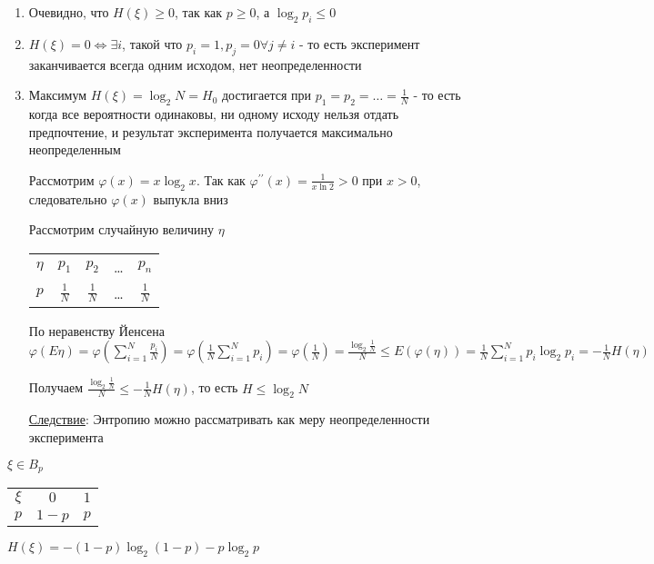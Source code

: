 \documentclass[12pt]{article}
\begin{document}
\begin{enumerate}
    \item Очевидно, что $H(\xi) \geq 0$, так как $p \geq 0$, а $\log_2 p_i \leq 0$
    
    \item $H(\xi) = 0 \Longleftrightarrow \exists i$, такой что $p_i = 1, p_j = 0 \forall j \neq i$ - то есть эксперимент заканчивается всегда одним исходом, нет неопределенности

    \item Максимум $H(\xi) = \log_2 N = H_0$ достигается при $p_1 = p_2 = \dots = \frac{1}{N}$ - то есть когда все вероятности одинаковы, ни одному исходу нельзя отдать предпочтение, и результат эксперимента получается максимально неопределенным

    \begin{MyProof}
        Рассмотрим $\varphi(x) = x \log_2 x$. Так как $\varphi^{\prime\prime}(x) = \frac{1}{x\ln 2} > 0$ при $x > 0$, следовательно $\varphi(x)$ выпукла вниз

        Рассмотрим случайную величину $\eta$

        \begin{tabular}{c|c|c|c|c}
            $\eta$ & $p_1$ & $p_2$ & \dots & $p_n$ \\
            \cline{1-6}
            $p$   & $\frac{1}{N}$ & $\frac{1}{N}$ & \dots & $\frac{1}{N}$
        \end{tabular}

        По неравенству Йенсена $\varphi(E\eta) = \varphi(\sum_{i = 1}^N \frac{p_i}{N}) = \varphi(\frac{1}{N} \sum_{i = 1}^N p_i) = 
        \varphi(\frac{1}{N}) = \frac{\log_2 \frac{1}{N}}{N} \leq E(\varphi(\eta)) = 
        \frac{1}{N} \sum_{i = 1}^N p_i \log_2 p_i = -\frac{1}{N} H(\eta)$

        Получаем $\frac{\log_2 \frac{1}{N}}{N} \leq -\frac{1}{N} H(\eta)$, то есть $H \leq \log_2 N$
    \end{MyProof}

    \underline{Следствие}: Энтропию можно рассматривать как меру неопределенности эксперимента
\end{enumerate}

\Ex $\xi \in B_{p}$

\begin{tabular}{c|c|c}
    $\xi$ & $0$ & $1$ \\
    \cline{1-6}
    $p$   & $1 - p$ & $p$
\end{tabular}

$H(\xi) = -(1 - p) \log_2 (1 - p) - p \log_2 p$
\end{document}
